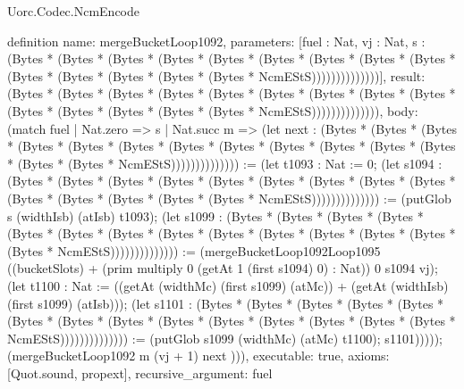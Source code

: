 \begin{lexlean}{Uorc.Codec.NcmEncode}
\begin{semanticmodule}
definition{
  name: mergeBucketLoop1092,
  parameters: [fuel : Nat, vj : Nat, s : (Bytes * (Bytes * (Bytes * (Bytes * (Bytes * (Bytes * (Bytes * (Bytes * (Bytes * (Bytes * (Bytes * (Bytes * (Bytes * (Bytes * NcmEStS))))))))))))))],
  result: (Bytes * (Bytes * (Bytes * (Bytes * (Bytes * (Bytes * (Bytes * (Bytes * (Bytes * (Bytes * (Bytes * (Bytes * (Bytes * (Bytes * NcmEStS)))))))))))))),
  body: (match fuel
    | Nat.zero => s
    | Nat.succ m => (let next : (Bytes * (Bytes * (Bytes * (Bytes * (Bytes * (Bytes * (Bytes * (Bytes * (Bytes * (Bytes * (Bytes * (Bytes * (Bytes * (Bytes * NcmEStS)))))))))))))) := (let t1093 : Nat := 0; (let s1094 : (Bytes * (Bytes * (Bytes * (Bytes * (Bytes * (Bytes * (Bytes * (Bytes * (Bytes * (Bytes * (Bytes * (Bytes * (Bytes * (Bytes * NcmEStS)))))))))))))) := (putGlob s (widthIsb) (atIsb) t1093); (let s1099 : (Bytes * (Bytes * (Bytes * (Bytes * (Bytes * (Bytes * (Bytes * (Bytes * (Bytes * (Bytes * (Bytes * (Bytes * (Bytes * (Bytes * NcmEStS)))))))))))))) := (mergeBucketLoop1092Loop1095 ((bucketSlots) + (prim multiply 0 (getAt 1 (first s1094) 0) : Nat)) 0 s1094 vj); (let t1100 : Nat := ((getAt (widthMc) (first s1099) (atMc)) + (getAt (widthIsb) (first s1099) (atIsb))); (let s1101 : (Bytes * (Bytes * (Bytes * (Bytes * (Bytes * (Bytes * (Bytes * (Bytes * (Bytes * (Bytes * (Bytes * (Bytes * (Bytes * (Bytes * NcmEStS)))))))))))))) := (putGlob s1099 (widthMc) (atMc) t1100); s1101))))); (mergeBucketLoop1092 m (vj + 1) next ))),
  executable: true,
  axioms: [Quot.sound, propext],
  recursive_argument: fuel
}


\end{semanticmodule}
\end{lexlean}

